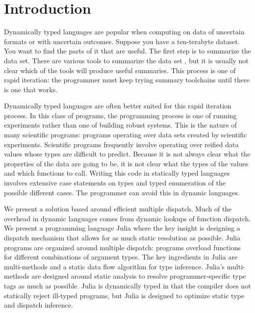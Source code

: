 \section{Introduction}

Dynamically typed languages are popular when computing on data of uncertain formats or with uncertain outcomes. Suppose you have a ten-terabyte dataset. You want to find the parts of it that are useful. The first step is to summarize the data set. There are various tools to summarize the data set , but it is usually not clear which of the tools will produce useful summaries. This process is one of rapid iteration: the programmer must keep trying summary toolchains until there is one that works. 

Dynamically typed languages are often better suited for this rapid iteration process. In this class of programs, the programming process is one of running experiments rather than one of building robust systems. This is the nature of many scientific programs: programs operating over data sets created by scientific experiments. Scientific programs frequently involve operating over reified data values whose types are difficult to predict. Because it is not always clear what the properties of the data are going to be, it is not clear what the types of the values and which functions to call.  Writing this code in statically typed languages involves extensive case statements on types and typed enumeration of the possible different cases. The programmer can avoid this in dynamic languages.

We present a solution based around efficient multiple dispatch. Much of the overhead in dynamic languages comes from dynamic lookups of function dispatch.  We present a programming language Julia where the key insight is designing a dispatch mechanism that allows for as much static resolution as possible. Julia programs are organized around multiple dispatch: programs overload functions for different combinations of argument types. The key ingredients in Julia are multi-methods and a static data flow algorithm for type inference. Julia's multi-methods are designed around static analysis to resolve programmer-specific type tags as much as possible. Julia is dynamically typed in that the compiler does not statically reject ill-typed programs, but Julia is designed to optimize static type and dispatch inference.

